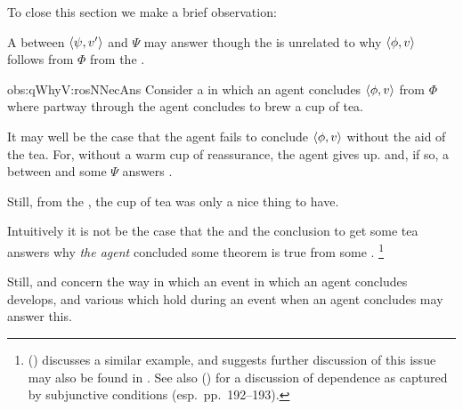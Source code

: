 

\begin{note}
  To close this section we make a brief observation:

  \begin{observation}%
    \label{obs:qWhyV:rosNNecAns}%
    A \ros{} between \(\langle \psi, v' \rangle\) and \(\Psi\) may answer \qWhyV{} though the \ros{} is unrelated to why \(\langle \phi, v \rangle\) follows from \(\Phi\) from the \agpe{\agents{}}.
  \end{observation}

  \begin{motivation}{obs:qWhyV:rosNNecAns}
    Consider a  in which an agent concludes \(\langle \phi, v \rangle\) from \(\Phi\) where partway through the agent concludes to brew a cup of tea.

    It may well be the case that the agent fails to conclude \(\langle \phi, v \rangle\) without the aid of the tea.
    For, without a warm cup of reassurance, the agent gives up.
    and, if so, a \ros{} between  and some \pool{} \(\Psi\) answers \qWhyV{}.

    Still, from the \agpe{\agents{}}, the cup of tea was only a nice thing to have.
  \end{motivation}

  \noindent%
  Intuitively it is not be the case that the \ros{} and the conclusion to get some tea answers why \emph{the agent} concluded some theorem is true from some \pool{}.%
    \footnote{
      \citeauthor{Armstrong:1968vh} (\citeyear[195--196]{Armstrong:1968vh}) discusses a similar example, and suggests further discussion of this issue may also be found in \textcite{Moore:1962up}.
      See also \citeauthor{Sanford:1989aa} (\citeyear{Sanford:1989aa}) for a discussion of dependence as captured by subjunctive conditions (esp.\ pp.\ 192--193).
    }

    Still, \qWhy{} and \qWhyV{} concern the way in which an event in which an agent concludes develops, and various \ros{} which hold during an event when an agent concludes may answer this.


\end{note}
